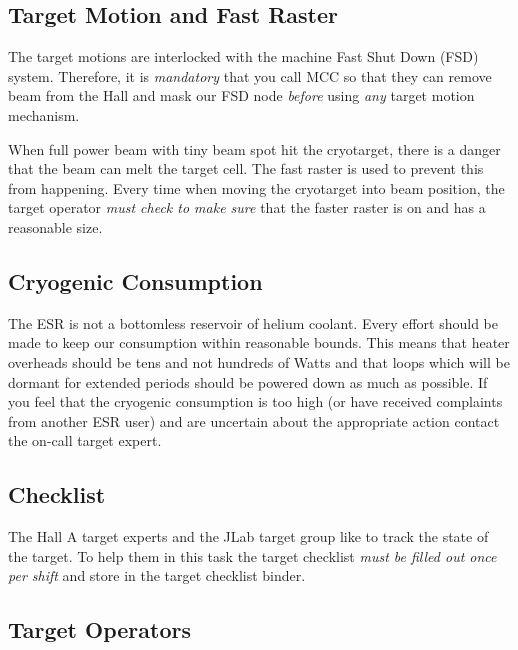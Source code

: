 \subsection{Target Motion and Fast Raster}

The target motions are interlocked with the machine Fast Shut Down (FSD) 
system. Therefore, it is \emph{mandatory} that you call MCC so that they can
remove beam from the Hall and mask our FSD node \emph{before} using \emph{any}
target motion mechanism.

\par
\begin{safetyen}{10}{5}
When full power beam with tiny beam spot hit the cryotarget, there is a danger 
that the beam can melt the target cell. The fast raster is used to prevent this
from happening. Every time when moving the cryotarget into beam position,
the target operator \emph {must check to make sure} that the faster raster 
is on and has a reasonable size.
\end{safetyen}


\subsection{Cryogenic Consumption}

The ESR is not a bottomless reservoir of helium coolant. Every effort should
be made to keep our consumption within reasonable bounds. This means that heater
overheads should be tens and not hundreds of Watts and that loops which will
be dormant for extended periods should be powered down as much as possible.
If you feel that the cryogenic consumption is too high (or have received complaints
from another ESR user) and are uncertain about the appropriate action contact
the on-call target expert.


\subsection{Checklist}

The Hall A target experts and the JLab target group like to track the state
of the target. To help them in this task the 
target checklist \emph{must be filled
out once per shift} and store in the target checklist binder.


\subsection{Target Operators}

